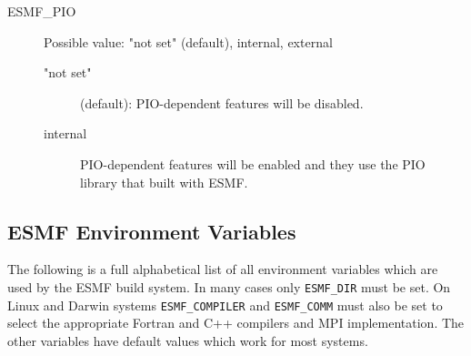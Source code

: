 \begin{description}
\item[ESMF\_PIO] Possible value: "not set" (default), internal, external

\begin{description}
\item["not set"] (default): PIO-dependent features will be disabled.

\item[internal] PIO-dependent features will be enabled and they use the PIO
library that built with ESMF.  

\end{description}

\end{description}


\subsection{ESMF Environment Variables}
\label{EnvironmentVariables}

The following is a full alphabetical list of all environment variables which
are used by the ESMF build system. In many cases only {\tt ESMF\_DIR} must be 
set. On Linux and Darwin systems {\tt ESMF\_COMPILER} and {\tt ESMF\_COMM} must
also be set to select the appropriate Fortran and C++ compilers and MPI 
implementation. The other variables have default values which work for
most systems.

